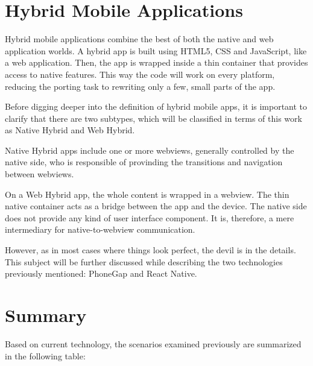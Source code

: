 \section{Hybrid Mobile Applications}

Hybrid mobile applications combine the best of both the native and web application worlds. A hybrid app is built using HTML5, CSS and JavaScript, like a web application. Then, the app is wrapped inside a thin container that provides access to native features. This way the code will work on every platform, reducing the porting task to rewriting only a few, small parts of the app.

Before digging deeper into the definition of hybrid mobile apps, it is important to clarify that there are two subtypes, which will be classified in terms of this work as Native Hybrid and Web Hybrid.

Native Hybrid apps include one or more webviews, generally controlled by the native side, who is responsible of provinding the transitions and navigation between webviews. 

On a Web Hybrid app, the whole content is wrapped in a webview. The thin native container acts as a bridge between the app and the device. The native side does not provide any kind of user interface component. It is, therefore, a mere intermediary for native-to-webview communication.

However, as in most cases where things look perfect, the devil is in the details. This subject will be further discussed while describing the two technologies previously mentioned: PhoneGap and React Native.

\section{Summary}

Based on current technology, the scenarios examined previously are summarized in the following table:

